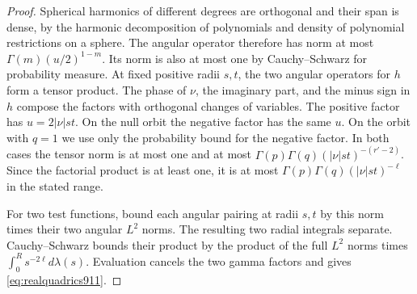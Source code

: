 \documentclass[a4paper,11pt]{article}
\theoremstyle{definition}
\theoremstyle{remark}
\numberwithin{equation}{section}
\begin{document}
\begin{proof}
Spherical harmonics of different degrees are orthogonal and
their span is dense, by the harmonic decomposition of
polynomials and density of polynomial restrictions on a sphere.
The angular operator therefore has norm at most
\(\Gamma(m)(u/2)^{1-m}\). Its norm is also at most one by
Cauchy--Schwarz for probability measure. At fixed positive
radii \(s,t\), the two angular operators for \(h\) form a
tensor product. The phase of \(\nu\), the imaginary part, and
the minus sign in \(h\) compose the factors with orthogonal
changes of variables. The positive factor has \(u=2|\nu|st\).
On the null orbit the negative factor has the same \(u\).
On the orbit with \(q=1\) we use only the probability bound
for the negative factor. In both cases the tensor norm is
at most one and at most
\(\Gamma(p)\Gamma(q)(|\nu|st)^{-(r'-2)}\).
Since the factorial product is at least one, it is at most
\(\Gamma(p)\Gamma(q)(|\nu|st)^{-\ell}\) in the stated range.

For two test functions, bound each angular pairing at radii
\(s,t\) by this norm times their two angular \(L^2\) norms.
The resulting two radial integrals separate. Cauchy--Schwarz
bounds their product by the product of the full \(L^2\) norms
times \(\int_0^R s^{-2\ell}d\lambda(s)\). Evaluation cancels
the two gamma factors and gives \eqref{eq:realquadrics911}.
\end{proof}
\end{document}
